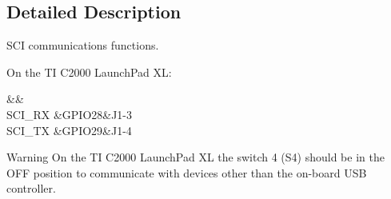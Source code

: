 \subsection{Detailed Description}
S\-C\-I communications functions. \begin{DoxyParagraph}{}
On the T\-I C2000 Launch\-Pad X\-L\-: \begin{TabularC}{3}
\hline
{}\PBS{}&\PBS{}&\PBS{}\\
\PBS\centering S\-C\-I\-\_\-\-R\-X &\PBS\centering G\-P\-I\-O28&\PBS\centering J1-\/3 \\
\PBS\centering S\-C\-I\-\_\-\-T\-X &\PBS\centering G\-P\-I\-O29&\PBS\centering J1-\/4 \\
\end{TabularC}

\end{DoxyParagraph}
\begin{DoxyWarning}{Warning}
On the T\-I C2000 Launch\-Pad X\-L the switch 4 (S4) should be in the O\-F\-F position to communicate with devices other than the on-\/board U\-S\-B controller. 
\end{DoxyWarning}


